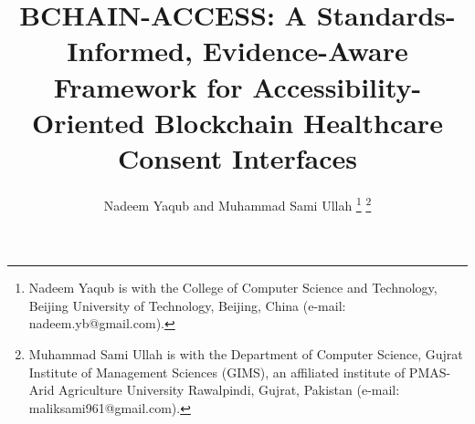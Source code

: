 \documentclass[journal]{IEEEtran}
\begin{document}
\title{BCHAIN-ACCESS: A Standards-Informed, Evidence-Aware Framework for Accessibility-Oriented Blockchain Healthcare Consent Interfaces}

\author{Nadeem Yaqub and Muhammad Sami Ullah%
\thanks{Nadeem Yaqub is with the College of Computer Science and Technology, Beijing University of Technology, Beijing, China (e-mail: nadeem.yb@gmail.com).}%
\thanks{Muhammad Sami Ullah is with the Department of Computer Science, Gujrat Institute of Management Sciences (GIMS), an affiliated institute of PMAS-Arid Agriculture University Rawalpindi, Gujrat, Pakistan (e-mail: maliksami961@gmail.com).}}


\maketitle
\end{document}
